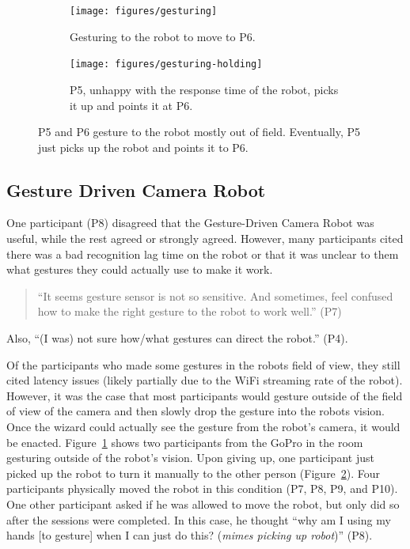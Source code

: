 \documentclass{tufte-handout}
\begin{document}
\begin{figure}
  \centering
  \begin{subfigure}[b]{0.9\columnwidth}
    \centering \texttt{[image: figures/gesturing]}
  \caption{\label{fig:sub:gesture} Gesturing to the robot to move to P6.}
\vspace{2pc}
\end{subfigure}
\begin{subfigure}[b]{0.9\columnwidth}
  \centering \texttt{[image: figures/gesturing-holding]}
  \caption{\label{fig:sub:grab} P5, unhappy with the response time of
    the robot, picks it up and points it at P6.}
  \end{subfigure}
  \caption{\label{fig:gesture} P5 and P6 gesture to the robot
    mostly out of field. Eventually, P5 just picks up the robot and
    points it to P6. }
\end{figure}

\subsection{Gesture Driven Camera Robot}
One participant (P8) disagreed that the Gesture-Driven Camera Robot
was useful, while the rest agreed or strongly agreed. However, many
participants cited there was a bad recognition lag time on the robot
or that it was unclear to them what gestures they could actually use
to make it work.
\begin{quote}
``It seems gesture sensor is not so sensitive. And sometimes,
feel confused how to make the right gesture to the robot to work
well.'' (P7)
\end{quote}
Also, ``(I was) not sure how/what gestures can direct the robot.''
(P4). 

Of the participants who made some gestures in the robots field of
view, they still cited latency issues (likely partially due to the
WiFi streaming rate of the robot).  However, it was the case that most
participants would gesture outside of the field of view of the camera
and then slowly drop the gesture into the robots vision.  Once the
wizard could actually see the gesture from the robot's camera, it
would be enacted. Figure~\ref{fig:sub:gesture} shows two participants
from the GoPro in the room gesturing outside of the robot's vision.
Upon giving up, one participant just picked up the robot to turn it
manually to the other person (Figure~\ref{fig:sub:grab}). Four
participants physically moved the robot in this condition (P7, P8, P9,
and P10). One other participant asked if he was allowed to move the
robot, but only did so after the sessions were completed. In this
case, he thought ``why am I using my hands [to gesture] when I can
just do this?  (\textit{mimes picking up robot})'' (P8).
\end{document}
